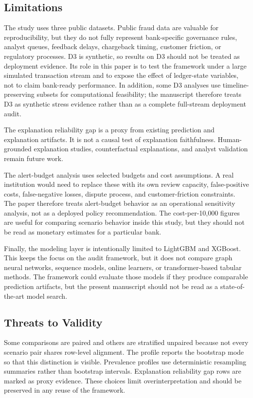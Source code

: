 \documentclass{ieeeaccess}
\begin{document}
\subsection{Limitations}
The study uses three public datasets. Public fraud data are valuable for reproducibility, but they do not fully represent bank-specific governance rules, analyst queues, feedback delays, chargeback timing, customer friction, or regulatory processes. D3 is synthetic, so results on D3 should not be treated as deployment evidence. Its role in this paper is to test the framework under a large simulated transaction stream and to expose the effect of ledger-state variables, not to claim bank-ready performance. In addition, some D3 analyses use timeline-preserving subsets for computational feasibility; the manuscript therefore treats D3 as synthetic stress evidence rather than as a complete full-stream deployment audit.

The explanation reliability gap is a proxy from existing prediction and explanation artifacts. It is not a causal test of explanation faithfulness. Human-grounded explanation studies, counterfactual explanations, and analyst validation remain future work.

The alert-budget analysis uses selected budgets and cost assumptions. A real institution would need to replace these with its own review capacity, false-positive costs, false-negative losses, dispute process, and customer-friction constraints. The paper therefore treats alert-budget behavior as an operational sensitivity analysis, not as a deployed policy recommendation. The cost-per-10,000 figures are useful for comparing scenario behavior inside this study, but they should not be read as monetary estimates for a particular bank.

Finally, the modeling layer is intentionally limited to LightGBM and XGBoost. This keeps the focus on the audit framework, but it does not compare graph neural networks, sequence models, online learners, or transformer-based tabular methods. The framework could evaluate those models if they produce comparable prediction artifacts, but the present manuscript should not be read as a state-of-the-art model search.

\subsection{Threats to Validity}
Some comparisons are paired and others are stratified unpaired because not every scenario pair shares row-level alignment. The profile reports the bootstrap mode so that this distinction is visible. Prevalence profiles use deterministic resampling summaries rather than bootstrap intervals. Explanation reliability gap rows are marked as proxy evidence. These choices limit overinterpretation and should be preserved in any reuse of the framework.
\end{document}
